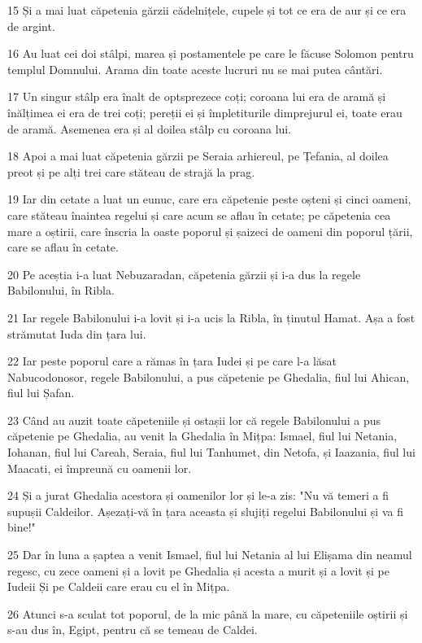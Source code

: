 \par 15 Și a mai luat căpetenia gărzii cădelnițele, cupele și tot ce era de aur și ce era de argint.
\par 16 Au luat cei doi stâlpi, marea și postamentele pe care le făcuse Solomon pentru templul Domnului. Arama din toate aceste lucruri nu se mai putea cântări.
\par 17 Un singur stâlp era înalt de optsprezece coți; coroana lui era de aramă și înălțimea ei era de trei coți; pereții ei și împletiturile dimprejurul ei, toate erau de aramă. Asemenea era și al doilea stâlp cu coroana lui.
\par 18 Apoi a mai luat căpetenia gărzii pe Seraia arhiereul, pe Țefania, al doilea preot și pe alți trei care stăteau de strajă la prag.
\par 19 Iar din cetate a luat un eunuc, care era căpetenie peste oșteni și cinci oameni, care stăteau înaintea regelui și care acum se aflau în cetate; pe căpetenia cea mare a oștirii, care înscria la oaste poporul și șaizeci de oameni din poporul țării, care se aflau în cetate.
\par 20 Pe aceștia i-a luat Nebuzaradan, căpetenia gărzii și i-a dus la regele Babilonului, în Ribla.
\par 21 Iar regele Babilonului i-a lovit și i-a ucis la Ribla, în ținutul Hamat. Așa a fost strămutat Iuda din țara lui.
\par 22 Iar peste poporul care a rămas în țara Iudei și pe care l-a lăsat Nabucodonosor, regele Babilonului, a pus căpetenie pe Ghedalia, fiul lui Ahican, fiul lui Șafan.
\par 23 Când au auzit toate căpeteniile și ostașii lor că regele Babilonului a pus căpetenie pe Ghedalia, au venit la Ghedalia în Mițpa: Ismael, fiul lui Netania, Iohanan, fiul lui Careah, Seraia, fiul lui Tanhumet, din Netofa, și Iaazania, fiul lui Maacati, ei împreună cu oamenii lor.
\par 24 Și a jurat Ghedalia acestora și oamenilor lor și le-a zis: "Nu vă temeri a fi supușii Caldeilor. Așezați-vă în țara aceasta și slujiți regelui Babilonului și va fi bine!"
\par 25 Dar în luna a șaptea a venit Ismael, fiul lui Netania al lui Elișama din neamul regesc, cu zece oameni și a lovit pe Ghedalia și acesta a murit și a lovit și pe Iudeii Și pe Caldeii care erau cu el în Mițpa.
\par 26 Atunci s-a sculat tot poporul, de la mic până la mare, cu căpeteniile oștirii și s-au dus în, Egipt, pentru că se temeau de Caldei.
